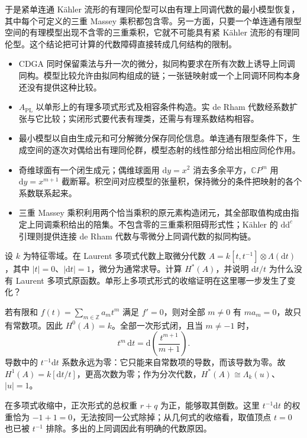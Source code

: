 于是紧单连通 Kähler 流形的有理同伦型可以由有理上同调代数的最小模型恢复，其中每个可定义的三重 Massey 乘积都包含零。另一方面，只要一个单连通有限型空间的有理模型出现不含零的三重乘积，它就不可能具有紧 Kähler 流形的有理同伦型。这个结论把可计算的代数障碍直接转成几何结构的限制。

\begin{chaptersummary}
	\begin{itemize}
		\item CDGA 同时保留乘法与升一次的微分，拟同构要求在所有次数上诱导上同调同构。模型比较允许由拟同构组成的链；一张链映射或一个上同调环同构本身还没有提供这种比较。
		\item \(A_{\mathrm{PL}}\) 以单形上的有理多项式形式及相容条件构造。实 de Rham 代数经系数扩张与它比较；实闭形式要代表有理类，还需与有理系数结构相容。
		\item 最小模型以自由生成元和可分解微分保存同伦信息。单连通有限型条件下，生成空间的逐次对偶给出有理同伦群，模型态射的线性部分给出相应同伦作用。
		\item 奇维球面有一个闭生成元；偶维球面用 \(\mathrm dy=x^2\) 消去多余平方，\(\mathbb CP^m\) 用 \(\mathrm dy=x^{m+1}\) 截断幂。积空间对应模型的张量积，保持微分的条件把映射的各个系数联系起来。
		\item 三重 Massey 乘积利用两个恰当乘积的原元素构造闭元，其全部取值构成由指定上同调乘积给出的陪集。不包含零的三重乘积阻碍形式性；Kähler 的 \(\mathrm d\mathrm d^c\) 引理则提供连接 de Rham 代数与零微分上同调代数的拟同构链。
	\end{itemize}
\end{chaptersummary}

\BookExercises

\begin{exercise}\label{g2:ex:laurent-polynomial-forms}
	设 \(k\) 为特征零域。在 Laurent 多项式代数上取微分代数 \(A=k[t,t^{-1}]\otimes\Lambda(\mathrm dt)\)，其中 \(|t|=0\)、\(|\mathrm dt|=1\)，微分为通常求导。计算 \(H^*(A)\)，并说明 \(\mathrm dt/t\) 为什么没有 Laurent 多项式原函数。单形上多项式形式的收缩证明在这里哪一步发生了变化？
\end{exercise}
\begin{solution}
	若有限和 \(f(t)=\sum_{m\in\mathbb Z}a_mt^m\) 满足 \(f'=0\)，则对全部 \(m\ne0\) 有 \(ma_m=0\)，故只有常数项。因此 \(H^0(A)=k\)。全部一次形式闭，且当 \(m\ne-1\) 时，
	\[
		t^m\,\mathrm dt=\mathrm d\left(\frac{t^{m+1}}{m+1}\right).
	\]
	导数中的 \(t^{-1}\mathrm dt\) 系数永远为零：它只能来自常数项的导数，而该导数为零。故 \(H^1(A)=k[\mathrm dt/t]\)，更高次数为零；作为分次代数，\(H^*(A)\cong\Lambda_k(u)\)、\(|u|=1\)。

	在多项式收缩中，正次形式的总权重 \(r+q\) 为正，能够取其倒数。这里 \(t^{-1}\mathrm dt\) 的权重恰为 \(-1+1=0\)，无法按同一公式除掉；从几何式的收缩看，取值顶点 \(t=0\) 也已被 \(t^{-1}\) 排除。多出的上同调因此有明确的代数原因。
\end{solution}

